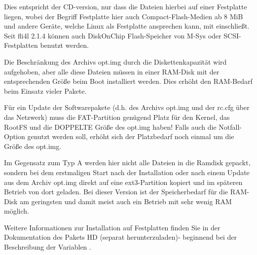 Dies entspricht der CD-version, nur dass die Dateien hierbei auf
einer Festplatte liegen, wobei der Begriff \glqq{}Festplatte\grqq{} hier auch
Compact-Flash-Medien ab 8 MiB und andere Geräte, welche Linux als
Festplatte ansprechen kann, mit einschließt. Seit fli4l 2.1.4 können
auch DiskOnChip Flash-Speicher von M-Sys oder SCSI-Festplatten benutzt
werden.

Die Beschränkung des Archivs opt.img durch die
Diskettenkapazität wird aufgehoben, aber alle diese Dateien müssen in
einer RAM-Disk mit der entsprechenden Größe beim Boot installiert werden.
Dies erhöht den RAM-Bedarf beim Einsatz vieler Pakete.

Für ein Update der Softwarepakete (d.h. des Archivs opt.img und der
rc.cfg über das Netzwerk) muss die FAT-Partition genügend Platz für den
Kernel, das RootFS und die DOPPELTE Größe des opt.img haben!
Falls auch die Notfall-Option genutzt werden soll, erhöht sich der
Platzbedarf noch einmal um die Größe des opt.img.


Im Gegensatz zum Typ A werden hier nicht alle Dateien in die Ramdisk
gepackt, sondern bei dem erstmaligen Start nach der Installation oder
nach einem Update aus dem Archiv opt.img direkt auf eine
ext3-Partition kopiert und im späteren Betrieb von dort geladen. Bei
dieser Version ist der Speicherbedarf für die RAM-Disk am geringsten
und damit meist auch ein Betrieb mit sehr wenig RAM möglich.

Weitere Informationen zur Installation auf Festplatten finden Sie in
der Dokumentation des Pakets HD (separat herunterzuladen)-
beginnend bei der Beschreibung der Variablen .
